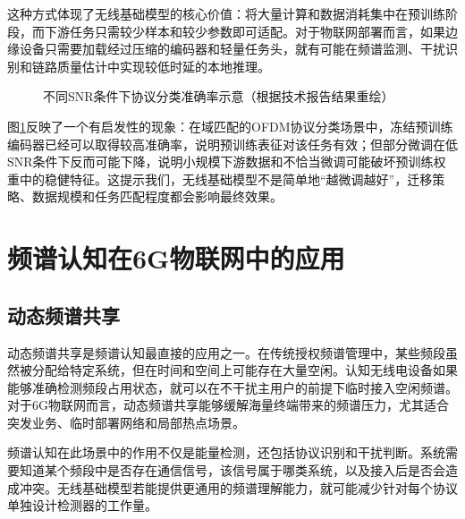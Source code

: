 \documentclass[UTF8,fontset=windows,zihao=-4]{ctexart}
\begin{document}
这种方式体现了无线基础模型的核心价值：将大量计算和数据消耗集中在预训练阶段，而下游任务只需较少样本和较少参数即可适配。对于物联网部署而言，如果边缘设备只需要加载经过压缩的编码器和轻量任务头，就有可能在频谱监测、干扰识别和链路质量估计中实现较低时延的本地推理。

\begin{figure}[H]
\centering
{}
\caption{不同SNR条件下协议分类准确率示意（根据技术报告结果重绘）}
\label{fig:snr-acc}
\end{figure}

图\ref{fig:snr-acc}反映了一个有启发性的现象：在域匹配的OFDM协议分类场景中，冻结预训练编码器已经可以取得较高准确率，说明预训练表征对该任务有效；但部分微调在低SNR条件下反而可能下降，说明小规模下游数据和不恰当微调可能破坏预训练权重中的稳健特征。这提示我们，无线基础模型不是简单地“越微调越好”，迁移策略、数据规模和任务匹配程度都会影响最终效果。

\clearpage
\section{频谱认知在6G物联网中的应用}
\subsection{动态频谱共享}
动态频谱共享是频谱认知最直接的应用之一。在传统授权频谱管理中，某些频段虽然被分配给特定系统，但在时间和空间上可能存在大量空闲。认知无线电设备如果能够准确检测频段占用状态，就可以在不干扰主用户的前提下临时接入空闲频谱。对于6G物联网而言，动态频谱共享能够缓解海量终端带来的频谱压力，尤其适合突发业务、临时部署网络和局部热点场景。

频谱认知在此场景中的作用不仅是能量检测，还包括协议识别和干扰判断。系统需要知道某个频段中是否存在通信信号，该信号属于哪类系统，以及接入后是否会造成冲突。无线基础模型若能提供更通用的频谱理解能力，就可能减少针对每个协议单独设计检测器的工作量。
\end{document}
